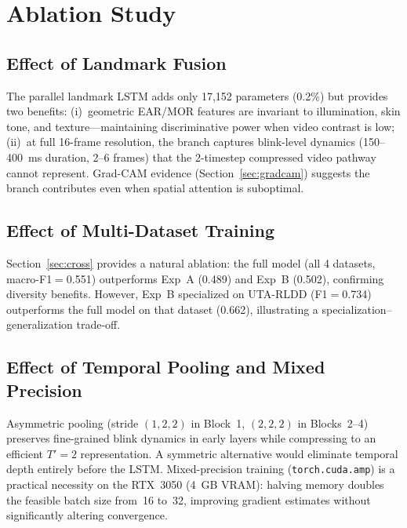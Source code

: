 \documentclass[journal]{IEEEtran}
\begin{document}
\section{Ablation Study}
\label{sec:ablation}

\subsection{Effect of Landmark Fusion}
\label{sec:ablation_lm}
The parallel landmark LSTM adds only 17,152 parameters (0.2\%) but provides two benefits: (i)~geometric EAR/MOR features are invariant to illumination, skin tone, and texture---maintaining discriminative power when video contrast is low; (ii)~at full 16-frame resolution, the branch captures blink-level dynamics (150--400~ms duration, 2--6 frames) that the 2-timestep compressed video pathway cannot represent. Grad-CAM evidence (Section~\ref{sec:gradcam}) suggests the branch contributes even when spatial attention is suboptimal.

\subsection{Effect of Multi-Dataset Training}
\label{sec:ablation_multi}
Section~\ref{sec:cross} provides a natural ablation: the full model (all 4 datasets, macro-F1$=$0.551) outperforms Exp~A (0.489) and Exp~B (0.502), confirming diversity benefits. However, Exp~B specialized on UTA-RLDD (F1$=$0.734) outperforms the full model on that dataset (0.662), illustrating a specialization--generalization trade-off.

\subsection{Effect of Temporal Pooling and Mixed Precision}
\label{sec:ablation_pool}
Asymmetric pooling (stride $(1,2,2)$ in Block~1, $(2,2,2)$ in Blocks~2--4) preserves fine-grained blink dynamics in early layers while compressing to an efficient $T'{=}2$ representation. A symmetric alternative would eliminate temporal depth entirely before the LSTM. Mixed-precision training (\texttt{torch.cuda.amp}) is a practical necessity on the RTX~3050 (4~GB VRAM): halving memory doubles the feasible batch size from~16 to~32, improving gradient estimates without significantly altering convergence.



\end{document}

